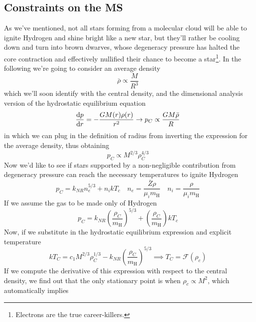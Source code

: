 \subsection{Constraints on the MS}

As we've mentioned, not all stars forming from a molecular cloud will be able to ignite Hydrogen and shine bright like a new star, but they'll rather be cooling down and turn into brown dwarves, whose degeneracy pressure has halted the core contraction and effectively nullified their chance to become a star\footnote{Electrons are the true career-killers.}. In the following we're going to consider an average density
\begin{equation*}
    \bar{\rho} \propto \frac{M}{R^{3}}
\end{equation*}
which we'll soon identify with the central density, and the dimensional analysis version of the hydrostatic equilibrium equation
\begin{equation*}
    \frac{\text{d}p}{\text{d}r} = -\frac{GM(r)\rho(r)}{r^{2}} \to p_{C} \propto \frac{GM\bar{\rho}}{R}
\end{equation*}
in which we can plug in the definition of radius from inverting the expression for the average density, thus obtaining
\begin{equation*}
    p_{C} \propto M^{2/3}\rho_{C}^{4/3}
\end{equation*}
Now we'd like to see if stars supported by a non-negligible contribution from degeneracy pressure can reach the necessary temperatures to ignite Hydrogen
\begin{equation*}
    p_{C} = k_{NR}n_{e}^{5/3} + n_{i}kT_{c} \quad n_{e} = \frac{\bar{Z}\rho}{\mu_{i}m_{\text{H}}} \quad n_{i} = \frac{\rho}{\mu_{i}m_{\text{H}}}
\end{equation*}
If we assume the gas to be made only of Hydrogen
\begin{equation*}
    p_{C} = k_{NR}\left(\frac{\rho_{C}}{m_{\text{H}}}\right)^{5/3} + \left(\frac{\rho_{C}}{m_{\text{H}}}\right)kT_{c}
\end{equation*}
Now, if we substitute in the hydrostatic equilibrium expression and explicit temperature
\begin{equation*}
    kT_{C} = c_{1}M^{2/3}\rho_{C}^{1/3}-k_{NR}\left(\frac{\rho_{C}}{m_{\text{H}}}\right)^{5/3} \implies T_{C} = \mathcal{F}(\rho_{c})
\end{equation*}
If we compute the derivative of this expression with respect to the central density, we find out that the only stationary point is when $\rho_{c}\propto M^{2}$, which automatically implies
